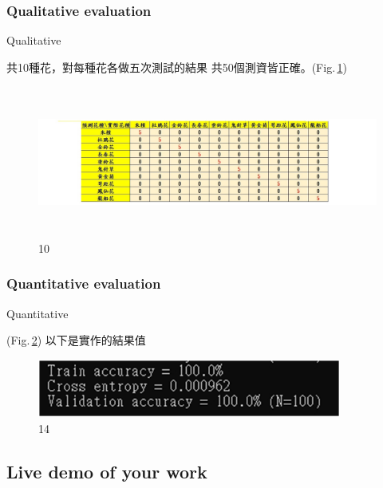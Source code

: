 \documentclass{beamer}
\begin{document}
\subsubsection{Qualitative evaluation}
\begin{frame}{Qualitative}
\begin{CJK}{UTF8}{bkai}
\small 共10種花，對每種花各做五次測試的結果 共50個測資皆正確。(Fig.\,\ref{fig:10})
 \end{CJK}
 \begin{figure}
    \includegraphics[width=12cm,height=5cm]{qualitative.jpg}
    \caption{10}
    \label{fig:10}
  \end{figure}
\end{frame}




\subsubsection{Quantitative evaluation}
\begin{frame}{Quantitative}

\begin{CJK}{UTF8}{bkai}
(Fig.\,\ref{fig:14})  
以下是實作的結果值
 \end{CJK}
 \begin{figure}
    \includegraphics[width=10cm]{Qauntitative.png}
    \caption{14}
    \label{fig:14}
  \end{figure}


\end{frame}

\subsection{Live demo of your work}
\end{document}
